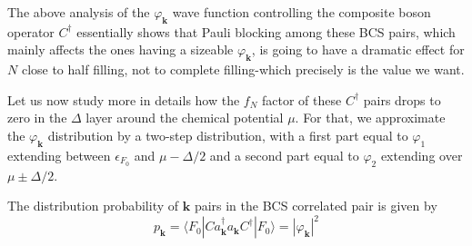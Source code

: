 \documentclass[aps,prb,preprint,groupedaddress,amsmath]{revtex4-1}
\newcommand{\vk}{\ensuremath{\mathbf{k}}}
\newcommand{\dg}{\ensuremath{\dagger}}
\begin{document}
The above analysis of the $\varphi_\vk$ wave function controlling the composite boson operator $C^\dg$ essentially shows that Pauli blocking among these BCS pairs, which mainly affects the ones having a sizeable $\varphi_\vk$, is going to have a dramatic effect for $N$ close to half filling, not to complete filling-which precisely is the value we want. 

Let us now study more in details how the $f_N$ factor of these $C^\dg$ pairs drops to zero in the $\Delta$ layer around the chemical potential $\mu$.  For that, we approximate the $\varphi_\vk$ distribution by a two-step distribution, with a first part equal to $\varphi_1$ extending between $\epsilon_{F_0}$ and $\mu-\Delta/2$ and a second part equal to $\varphi_2$ extending over $\mu\pm\Delta/2$. 


  The distribution probability of $\vk$ pairs in the BCS correlated pair is  given by 
\begin{equation}
p_\vk=\langle{}F_0|Ca^\dg_\vk{}a_\vk{}C^\dg|F_0\rangle=|\varphi_\vk|^2
\end{equation}
%


\end{document}
